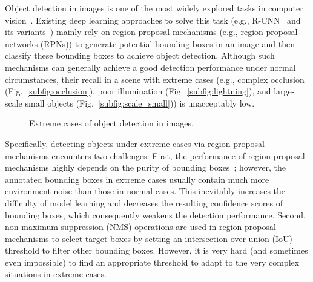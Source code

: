 \documentclass{article}
\begin{document}
Object detection in images is one of the most widely explored tasks in computer vision~\cite{he2017mask,he2016deep}. Existing deep learning approaches to solve this task (e.g., R-CNN~\cite{girshick2014rich} and its variants~\cite{girshick2015fast,ren2015fasterrcnn,he2017mask}) mainly rely on region proposal mechanisms (e.g., region proposal networks (RPNs)) to generate potential bounding boxes in an image and then classify these bounding boxes to achieve object detection. Although such mechanisms can generally achieve a good detection performance under normal circumstances, their recall in a scene with extreme cases (e.g., complex occlusion (Fig.~\ref{subfig:occlusion}), poor illumination  (Fig.~\ref{subfig:lightning}), and large-scale small objects (Fig.~\ref{subfig:scale_small})) is unacceptably low.

\begin{figure}[!ht]
  \centering
  \caption{Extreme cases of object detection in images.\label{fig:extreme_cases}}
\end{figure}

Specifically, detecting objects under extreme cases via region proposal mechanisms encounters two challenges: First, the performance of region proposal mechanisms highly depends on the purity of bounding boxes~\cite{guo2016deep}; however, the annotated bounding boxes in extreme cases usually contain much more environment noise than those in normal cases. This inevitably increases the difficulty of model learning and decreases the resulting confidence scores of bounding boxes, which consequently weakens the detection performance. Second, non-maximum suppression (NMS) operations are used in region proposal mechanisms  to select target boxes by setting an intersection over union (IoU) threshold to filter other bounding boxes. However, it is very hard (and sometimes even impossible) to find an appropriate threshold to adapt to the very complex situations in extreme cases.
\end{document}
